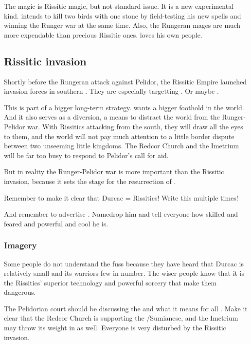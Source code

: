 The \EreshKali{} magic is Rissitic magic, but not standard issue. 
It is a new experimental kind. 
\Secherdamon{} intends to kill two birds with one stone by field-testing his new spells and winning the Runger war at the same time. 
Also, the Rungeran mages are much more expendable than precious Rissitic ones. 
\Secherdamon{} loves his own people. 









\subsection{Rissitic invasion}
Shortly before the Rungeran attack against Pelidor, the Rissitic Empire launched invasion forces in southern \Galessan. 
They are especially targetting . 
Or maybe \Scyrum. 

This is part of a bigger long-term strategy. 
\Secherdamon{} wants a bigger foothold in the world. 
And it also serves as a diversion, a means to distract the world from the Runger-Pelidor war. 
With Rissitics attacking from the south, they will draw all the eyes to them, and the world will not pay much attention to a little border dispute between two unseeming little kingdoms. 
The Redcor Church and the Imetrium will be far too busy to respond to Pelidor's call for aid. 

But in reality the Runger-Pelidor war is more important than the Rissitic invasion, because it sets the stage for the resurrection of \Nithdornazsh. 

Remember to make it clear that Durcac = Rissitics! 
Write this multiple times! 

And remember to advertise . 
Namedrop him and tell everyone how skilled and feared and powerful and cool he is. 





\subsubsection{Imagery}
Some people do not understand the fuss because they have heard that Durcac is relatively small and its warriors few in number.
The wiser people know that it is the Rissitics' superior technology and powerful sorcery that make them dangerous.

The Pelidorian court should be discussing the  and what it means for all \Galessan. 
Make it clear that the Redcor Church is supporting the \Scyrics/Sumianese, and the Imetrium may throw its weight in as well. 
Everyone is very disturbed by the Rissitic invasion. 

